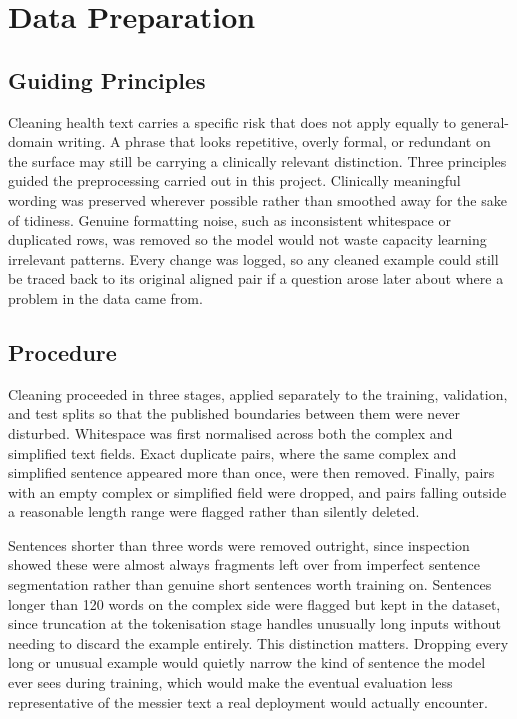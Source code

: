 \chapter{Data Preparation}
\label{ch:data-preparation}

\section{Guiding Principles}
\label{sec:cleaning-principles}

Cleaning health text carries a specific risk that does not apply equally to general-domain writing. A phrase that looks repetitive, overly formal, or redundant on the surface may still be carrying a clinically relevant distinction. Three principles guided the preprocessing carried out in this project. Clinically meaningful wording was preserved wherever possible rather than smoothed away for the sake of tidiness. Genuine formatting noise, such as inconsistent whitespace or duplicated rows, was removed so the model would not waste capacity learning irrelevant patterns. Every change was logged, so any cleaned example could still be traced back to its original aligned pair if a question arose later about where a problem in the data came from.

\section{Procedure}
\label{sec:cleaning-procedure}

Cleaning proceeded in three stages, applied separately to the training, validation, and test splits so that the published boundaries between them were never disturbed. Whitespace was first normalised across both the complex and simplified text fields. Exact duplicate pairs, where the same complex and simplified sentence appeared more than once, were then removed. Finally, pairs with an empty complex or simplified field were dropped, and pairs falling outside a reasonable length range were flagged rather than silently deleted.

Sentences shorter than three words were removed outright, since inspection showed these were almost always fragments left over from imperfect sentence segmentation rather than genuine short sentences worth training on. Sentences longer than 120 words on the complex side were flagged but kept in the dataset, since truncation at the tokenisation stage handles unusually long inputs without needing to discard the example entirely. This distinction matters. Dropping every long or unusual example would quietly narrow the kind of sentence the model ever sees during training, which would make the eventual evaluation less representative of the messier text a real deployment would actually encounter.

